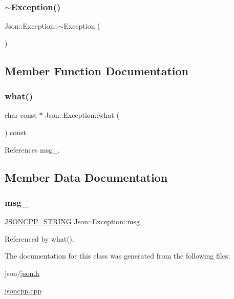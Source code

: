 \subsubsection{\texorpdfstring{$\sim$\+Exception()}{~Exception()}}
{\footnotesize\ttfamily Json\+::\+Exception\+::$\sim$\+Exception (\begin{DoxyParamCaption}{ }\end{DoxyParamCaption})}



\subsection{Member Function Documentation}
\mbox{\label{classJson_1_1Exception_a70b7ce35e761fb93e8cd338e04619cd6_a70b7ce35e761fb93e8cd338e04619cd6}} 
\subsubsection{\texorpdfstring{what()}{what()}}
{\footnotesize\ttfamily char const  $\ast$ Json\+::\+Exception\+::what (\begin{DoxyParamCaption}{ }\end{DoxyParamCaption}) const}



References msg\+\_\+.



\subsection{Member Data Documentation}
\mbox{\label{classJson_1_1Exception_aae3cbb8b45bf21480f64502a8329659f_aae3cbb8b45bf21480f64502a8329659f}} 
\subsubsection{\texorpdfstring{msg\+\_\+}{msg\_}}
{\footnotesize\ttfamily \hyperlink{json_8h_a1e723f95759de062585bc4a8fd3fa4be_a1e723f95759de062585bc4a8fd3fa4be}{J\+S\+O\+N\+C\+P\+P\+\_\+\+S\+T\+R\+I\+NG} Json\+::\+Exception\+::msg\+\_\+\hspace{0.3cm}{\ttfamily [protected]}}



Referenced by what().



The documentation for this class was generated from the following files\+:\begin{DoxyCompactItemize}
\item 
json/\hyperlink{json_8h}{json.\+h}\item 
\hyperlink{jsoncpp_8cpp}{jsoncpp.\+cpp}\end{DoxyCompactItemize}
